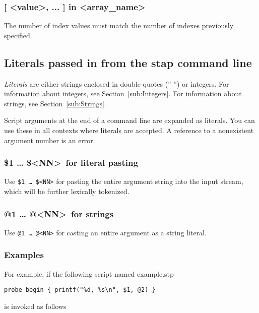 \documentclass[twoside,english]{article}
\newenvironment{vindent}
{\begin{list}{}{\setlength{\listparindent}{6pt}}
\item[]}
{\end{list}}
\begin{document}
\subsubsection{{[} \textless value\textgreater, ... ] in \textless array\_name\textgreater}

The number of index values must match the number of indexes previously specified.

\subsection{Literals passed in from the stap command line\label{sub:Literals-passed-in}}
\emph{Literals} are either strings enclosed in double quotes ('' '') or
integers. For information about integers, see Section~\ref{sub:Integers}.
For information about strings, see Section~\ref{sub:Strings}.

Script arguments at the end of a command line are expanded as literals. You
can use these in all contexts where literals are accepted. A reference to
a nonexistent argument number is an error.


\subsubsection{\$1 \ldots{} \$\textless NN\textgreater\ for literal pasting}
\index{\$}
Use \texttt{\$1 \ldots{} \$<NN>} for pasting the entire argument string 
into the input stream, which will be further lexically tokenized.

\subsubsection{@1 \ldots{} @\textless NN\textgreater\ for strings}

Use \texttt{@1 \ldots{} @<NN>} for casting an entire argument
as a string literal.

\subsubsection{Examples}

For example, if the following script named example.stp

\begin{vindent}
\begin{verbatim}
probe begin { printf("%d, %s\n", $1, @2) }
\end{verbatim}
\end{vindent}
is invoked as follows
\end{document}

